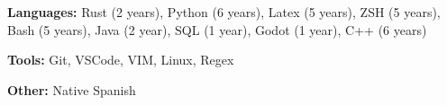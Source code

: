 \documentclass[../main.tex]{subfiles}
\begin{document}

 \textbf{Languages:} Rust (2 years), Python (6 years), Latex (5 years), ZSH (5 years), Bash (5 years), Java (2 year), SQL (1 year), Godot (1 year), C++ (6 years)

 \textbf{Tools:} Git, VSCode, VIM, Linux, Regex

 \textbf{Other:} Native Spanish 
\end{document}
